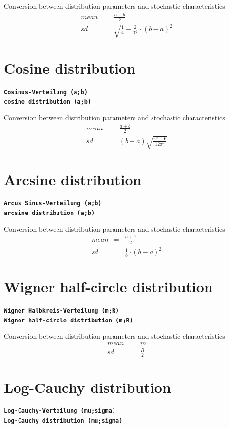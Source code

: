 \documentclass{svmono}
\def\cm#1{\textbf{\texttt{#1}}}
\begin{document}
Conversion between distribution parameters and stochastic characteristics
\begin{eqnarray*}
mean&=&\frac{a+b}{2}\\
sd&=&\sqrt{\frac{1}{4}-\frac{2}{\pi^2}}\cdot(b-a)^2
\end{eqnarray*}





\section*{Cosine distribution}
\cm{Cosinus-Verteilung (a;b)}~\\
\cm{cosine distribution (a;b)}

Conversion between distribution parameters and stochastic characteristics
\begin{eqnarray*}
mean&=&\frac{a+b}{2}\\
sd&=&(b-a)\sqrt{\frac{\pi^2-6}{12\pi^2}}
\end{eqnarray*}





\section*{Arcsine distribution}
\cm{Arcus Sinus-Verteilung (a;b)}~\\
\cm{arcsine distribution (a;b)}

Conversion between distribution parameters and stochastic characteristics
\begin{eqnarray*}
mean&=&\frac{a+b}{2}\\
sd&=&\frac{1}{8}\cdot(b-a)^2
\end{eqnarray*}




\section*{Wigner half-circle distribution}
\cm{Wigner Halbkreis-Verteilung (m;R)}~\\
\cm{Wigner half-circle distribution (m;R)}

Conversion between distribution parameters and stochastic characteristics
\begin{eqnarray*}
mean&=&m\\
sd&=&\frac{R}{2}
\end{eqnarray*}



\section*{Log-Cauchy distribution}
\cm{Log-Cauchy-Verteilung (mu;sigma)}~\\
\cm{Log-Cauchy distribution (mu;sigma)}
\end{document}
